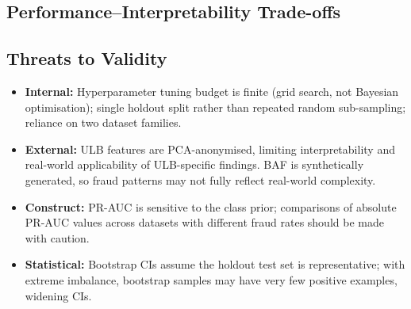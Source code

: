 \subsection{Performance--Interpretability Trade-offs}


\subsection{Threats to Validity}
\begin{itemize}
  \item \textbf{Internal:} Hyperparameter tuning budget is finite
    (grid search, not Bayesian optimisation); single holdout split rather
    than repeated random sub-sampling; reliance on two dataset families.
  \item \textbf{External:} ULB features are PCA-anonymised, limiting
    interpretability and real-world applicability of ULB-specific findings.
    BAF is synthetically generated, so fraud patterns may not fully
    reflect real-world complexity.
  \item \textbf{Construct:} PR-AUC is sensitive to the class prior;
    comparisons of absolute PR-AUC values across datasets with different
    fraud rates should be made with caution.
  \item \textbf{Statistical:} Bootstrap CIs assume the holdout test set
    is representative; with extreme imbalance, bootstrap samples may
    have very few positive examples, widening CIs.
\end{itemize}
